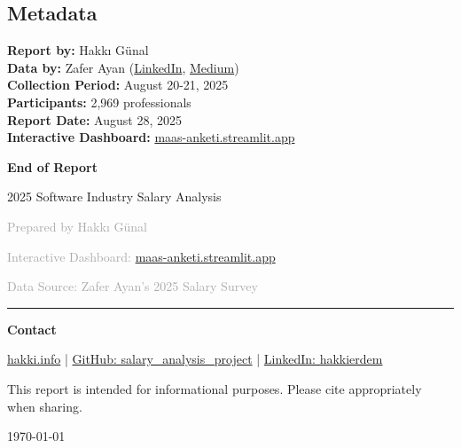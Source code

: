 \documentclass[12pt,a4paper]{article}
\begin{document}
	\subsection{Metadata}
	\begin{center}
		\textbf{Report by:} Hakkı Günal\\
		\textbf{Data by:} Zafer Ayan (\href{https://www.linkedin.com/posts/zaferayan_geleneksel-maa%C5%9F-anketi-buyrun-httpslnkdin-activity-7363866008664629248-7YcQ}{LinkedIn}, \href{https://zaferayan.medium.com/2025-a%C4%9Fustos-detayl%C4%B1-maa%C5%9F-anketi-98446d71920a}{Medium})\\
			\textbf{Collection Period:} August 20-21, 2025\\
			\textbf{Participants:} 2,969 professionals\\
			\textbf{Report Date:} August 28, 2025\\
			\textbf{Interactive Dashboard:} \href{https://maas-anketi.streamlit.app/}{maas-anketi.streamlit.app}
			\end{center}
\newpage
\thispagestyle{empty}
\begin{center}
    \vspace*{2cm}
    {\Huge \bfseries \color{titleblue} End of Report}\par
    \vspace{0.8cm}
    {\large \color{darkgray} 2025 Software Industry Salary Analysis}\par
    \vspace{0.6cm}
    \textcolor{darkgray}{Prepared by Hakkı Günal}\par
    \vspace{0.3cm}
    \textcolor{darkgray}{Interactive Dashboard: \href{https://maas-anketi.streamlit.app/}{maas-anketi.streamlit.app}}\par
    \vspace{0.3cm}
    \textcolor{darkgray}{Data Source: Zafer Ayan's 2025 Salary Survey}\par
    \vspace{1.2cm}
    \textcolor{titleblue}{\rule{0.7\textwidth}{0.8pt}}\par
    \vspace{0.8cm}
    {\large \color{titleblue} \textbf{Contact}}\par
    \vspace{0.35cm}
    {\normalsize \color{darkgray}
        \href{https://hakki.info}{hakki.info} \quad | \quad
        \href{https://github.com/erdemgunal/salary_analysis_project/}{GitHub: salary\_analysis\_project} \quad | \quad
        \href{https://www.linkedin.com/in/hakkierdem/}{LinkedIn: hakkierdem}
    }\par
    \vspace{0.8cm}
    {\small \color{darkgray} This report is intended for informational purposes. Please cite appropriately when sharing.}\par
    \vfill
    {\small \color{darkgray} \today}
\end{center}
\end{document}
